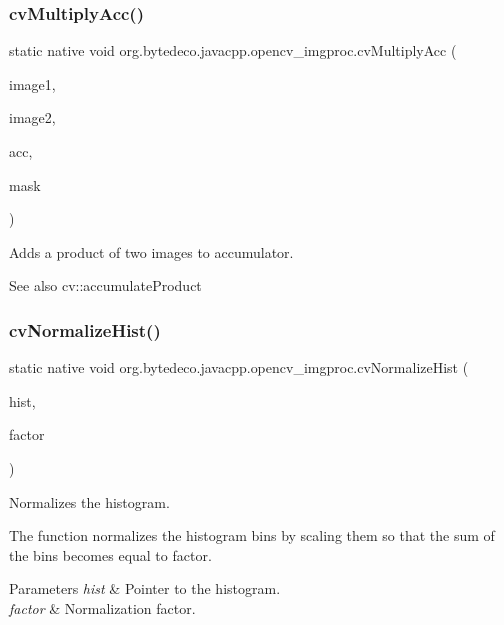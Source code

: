 \subsubsection{\texorpdfstring{cv\+Multiply\+Acc()}{cvMultiplyAcc()}}
{\footnotesize\ttfamily static native void org.\+bytedeco.\+javacpp.\+opencv\+\_\+imgproc.\+cv\+Multiply\+Acc (\begin{DoxyParamCaption}\item[{@Const Cv\+Arr}]{image1,  }\item[{@Const Cv\+Arr}]{image2,  }\item[{Cv\+Arr}]{acc,  }\item[{@Const Cv\+Arr}]{mask }\end{DoxyParamCaption})\hspace{0.3cm}{\ttfamily [static]}}



Adds a product of two images to accumulator. 

\begin{DoxySeeAlso}{See also}
cv\+::accumulate\+Product 
\end{DoxySeeAlso}
\mbox{\label{group__imgproc__c_gaae040215ddf5f0582fd04464ea27495f}} 
\subsubsection{\texorpdfstring{cv\+Normalize\+Hist()}{cvNormalizeHist()}}
{\footnotesize\ttfamily static native void org.\+bytedeco.\+javacpp.\+opencv\+\_\+imgproc.\+cv\+Normalize\+Hist (\begin{DoxyParamCaption}\item[{Cv\+Histogram}]{hist,  }\item[{double}]{factor }\end{DoxyParamCaption})\hspace{0.3cm}{\ttfamily [static]}}



Normalizes the histogram. 

The function normalizes the histogram bins by scaling them so that the sum of the bins becomes equal to factor. 


\begin{DoxyParams}{Parameters}
{\em hist} & Pointer to the histogram. \\
\hline
{\em factor} & Normalization factor. \\
\hline
\end{DoxyParams}
\mbox{\label{group__imgproc__c_ga9702f652ace9af304514bd89286968b5}} 
